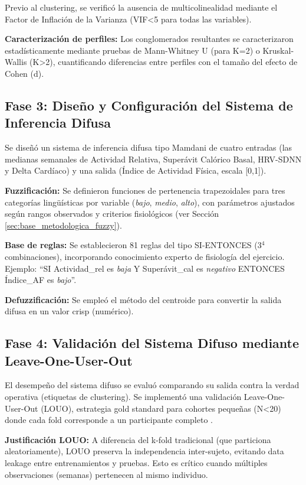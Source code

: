 Previo al clustering, se verificó la ausencia de multicolinealidad mediante el Factor de Inflación de la Varianza (VIF<5 para todas las variables).

\textbf{Caracterización de perfiles:} Los conglomerados resultantes se caracterizaron estadísticamente mediante pruebas de Mann-Whitney U (para K=2) o Kruskal-Wallis (K>2), cuantificando diferencias entre perfiles con el tamaño del efecto de Cohen (d).

\subsection{Fase 3: Diseño y Configuración del Sistema de Inferencia Difusa}
\label{subsec:fase3_diseno_fuzzy}

Se diseñó un sistema de inferencia difusa tipo Mamdani de cuatro entradas (las medianas semanales de Actividad Relativa, Superávit Calórico Basal, HRV-SDNN y Delta Cardíaco) y una salida (Índice de Actividad Física, escala [0,1]).

\textbf{Fuzzificación:} Se definieron funciones de pertenencia trapezoidales para tres categorías lingüísticas por variable (\textit{bajo}, \textit{medio}, \textit{alto}), con parámetros ajustados según rangos observados y criterios fisiológicos (ver Sección \ref{sec:base_metodologica_fuzzy}).

\textbf{Base de reglas:} Se establecieron 81 reglas del tipo SI-ENTONCES (3$^4$ combinaciones), incorporando conocimiento experto de fisiología del ejercicio. Ejemplo: ``SI Actividad\_rel es \textit{baja} Y Superávit\_cal es \textit{negativo} ENTONCES Índice\_AF es \textit{bajo}''.

\textbf{Defuzzificación:} Se empleó el método del centroide para convertir la salida difusa en un valor crisp (numérico).

\subsection{Fase 4: Validación del Sistema Difuso mediante Leave-One-User-Out}
\label{subsec:fase4_validacion_louo}

El desempeño del sistema difuso se evaluó comparando su salida contra la verdad operativa (etiquetas de clustering). Se implementó una validación Leave-One-User-Out (LOUO), estrategia gold standard para cohortes pequeñas (N<20) donde cada fold corresponde a un participante completo \cite{Alinia2020,Crozat2025}.

\textbf{Justificación LOUO:} A diferencia del k-fold tradicional (que particiona aleatoriamente), LOUO preserva la independencia inter-sujeto, evitando data leakage entre entrenamientos y pruebas. Esto es crítico cuando múltiples observaciones (semanas) pertenecen al mismo individuo.

